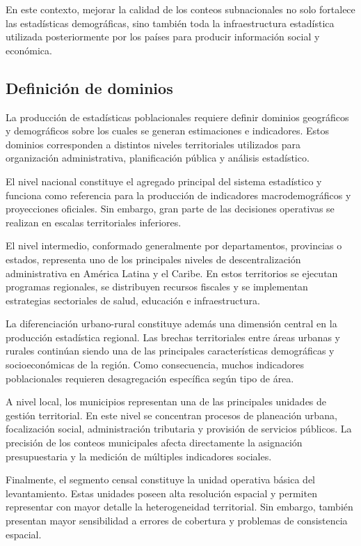 \documentclass[
  spanish,
]{book}
\begin{document}
En este contexto, mejorar la calidad de los conteos subnacionales no solo fortalece las estadísticas demográficas, sino también toda la infraestructura estadística utilizada posteriormente por los países para producir información social y económica.

\subsection{Definición de dominios}\label{definiciuxf3n-de-dominios}

La producción de estadísticas poblacionales requiere definir dominios geográficos y demográficos sobre los cuales se generan estimaciones e indicadores. Estos dominios corresponden a distintos niveles territoriales utilizados para organización administrativa, planificación pública y análisis estadístico.

El nivel nacional constituye el agregado principal del sistema estadístico y funciona como referencia para la producción de indicadores macrodemográficos y proyecciones oficiales. Sin embargo, gran parte de las decisiones operativas se realizan en escalas territoriales inferiores.

El nivel intermedio, conformado generalmente por departamentos, provincias o estados, representa uno de los principales niveles de descentralización administrativa en América Latina y el Caribe. En estos territorios se ejecutan programas regionales, se distribuyen recursos fiscales y se implementan estrategias sectoriales de salud, educación e infraestructura.

La diferenciación urbano-rural constituye además una dimensión central en la producción estadística regional. Las brechas territoriales entre áreas urbanas y rurales continúan siendo una de las principales características demográficas y socioeconómicas de la región. Como consecuencia, muchos indicadores poblacionales requieren desagregación específica según tipo de área.

A nivel local, los municipios representan una de las principales unidades de gestión territorial. En este nivel se concentran procesos de planeación urbana, focalización social, administración tributaria y provisión de servicios públicos. La precisión de los conteos municipales afecta directamente la asignación presupuestaria y la medición de múltiples indicadores sociales.

Finalmente, el segmento censal constituye la unidad operativa básica del levantamiento. Estas unidades poseen alta resolución espacial y permiten representar con mayor detalle la heterogeneidad territorial. Sin embargo, también presentan mayor sensibilidad a errores de cobertura y problemas de consistencia espacial.
\end{document}
